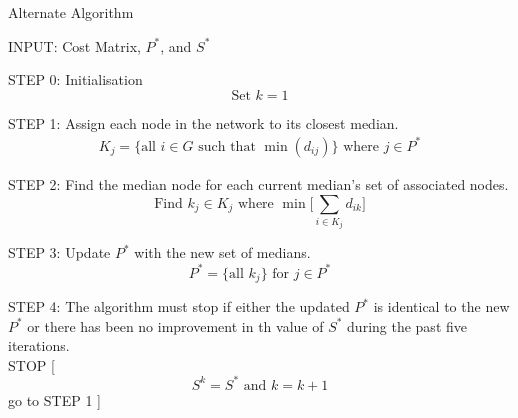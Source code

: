 \documentclass[11pt]{article}
\begin{document}
\begin{algorithm}
	\caption{Alternate Algorithm}
	\begin{algorithmic}[0]
		\Statex 
		\Statex INPUT: Cost Matrix, $P^*$, and $S^*$
		
		\Statex 
		\Statex STEP 0: Initialisation
		\Statex 
		\begin{equation*}
		\text{Set } k = 1
		\end{equation*}
		
		\Statex 
		\Statex STEP 1: Assign each node in the network to its closest median.
		\begin{align*}
		K_j=\{\text{all } i \in G \text{ such that } \min (d_{ij})\} \text{ where } j \in P^*
		\end{align*}
		
		\Statex 
		\Statex STEP 2: Find the median node for each current median's set of associated nodes.
		\begin{equation*}
		\text{Find } k_j \in K_j \text{ where } \min \bigg[ \sum_{i\in K_j} d_{ik} \bigg] 
		\end{equation*}

		
		\Statex 
		\Statex STEP 3: Update $P^*$ with the new set of medians.
		\begin{equation*}
		P^{*} = \{\text{all } k_j  \} \text{ for } j \in P^*
		\end{equation*}
		
		\Statex 
		\Statex STEP 4: The algorithm must stop if either the updated $P^*$ is identical to the new $P^*$ or there has been no improvement in th value of $S^*$ during the past five iterations.\\
		
		\Statex STOP
		[
		\Else
		\begin{equation*}
		S^k = S^* \text{ and } k = k+1
		\end{equation*}
		\Statex go to STEP 1
		]
		\EndIf
		
		
	\end{algorithmic}
\end{algorithm}
		
		
\end{document}
